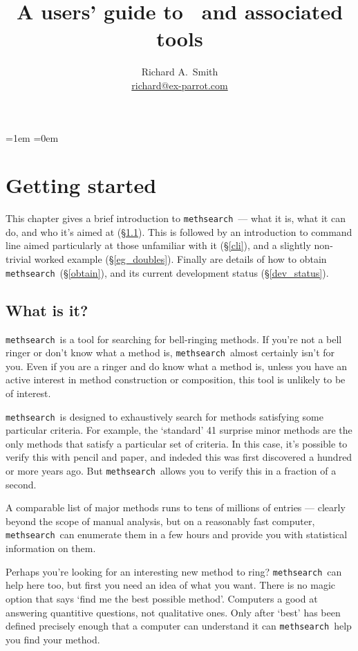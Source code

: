 \documentclass[a4paper,11pt,oneside]{book}
\title{A users' guide to \methsearch\ and associated tools}
\author{Richard A.\ Smith\\\url{richard@ex-parrot.com}}
\def\methsearch{\texttt{meth\-search}}
\newcommand{\sref}[1]{\hyperref[#1]{\S\ref{#1}}}
\begin{document}
\frontmatter
\maketitle

\tableofcontents
\parskip=1em
\parindent=0em
\addtolength{\footnotesep}{4pt}

\mainmatter

\chapter{Getting started}

This chapter gives a brief introduction to \methsearch\ --- what it is,
what it can do, and who it's aimed at (\sref{what_is_it}).  
This is followed by an introduction to command line aimed particularly 
at those unfamiliar with it (\sref{cli}), and
a slightly non-trivial worked example (\sref{eg_doubles}).  Finally are
details of how to obtain \methsearch\ (\sref{obtain}), and its
current development status (\sref{dev_status}).


\section{What is it?}\label{what_is_it}

\methsearch\ is a tool for searching for bell-ringing methods.
If you're not a bell ringer or don't know what a method is, 
\methsearch\ almost certainly isn't for you.
Even if you are a ringer and do know what a method is, unless you have 
an active interest in method construction or composition, 
this tool is unlikely to be of interest.

\methsearch\ is designed to exhaustively search for methods satisfying
some particular criteria.  For example, the `standard' 41 surprise minor
methods are the only methods that satisfy a particular set of criteria.
In this case, it's possible to verify this with pencil and paper, and 
indeded this was first discovered a hundred or more years ago.  But 
\methsearch\ allows you to verify this in a fraction of a second.

A comparable list of major methods runs to tens of millions of entries ---
clearly beyond the scope of manual analysis, but on a reasonably 
fast computer, \methsearch\ can enumerate them in a few hours and provide 
you with statistical information on them.

Perhaps you're looking for an interesting new method to ring?  
\methsearch\ can help here too, but first you need an idea of what you want.
There is no magic option that says `find me the best possible method'.
Computers a good at answering quantitive questions, not qualitative ones.
Only after `best' has been defined precisely enough that a computer 
can understand it can \methsearch\ help you find your method.
\end{document}
